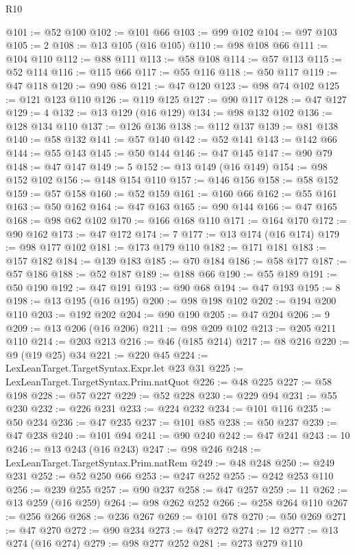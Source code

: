 \begin{lexlean}{R10}
\begin{coremodule}
@101 := @52 @100
@102 := @101 @66
@103 := @99 @102
@104 := @97 @103
@105 := 2
@108 := @13 @105 (@16 @105)
@110 := @98 @108 @66
@111 := @104 @110
@112 := @88 @111
@113 := @58 @108
@114 := @57 @113
@115 := @52 @114
@116 := @115 @66
@117 := @55 @116
@118 := @50 @117
@119 := @47 @118
@120 := @90 @86
@121 := @47 @120
@123 := @98 @74 @102
@125 := @121 @123 @110
@126 := @119 @125
@127 := @90 @117
@128 := @47 @127
@129 := 4
@132 := @13 @129 (@16 @129)
@134 := @98 @132 @102
@136 := @128 @134 @110
@137 := @126 @136
@138 := @112 @137
@139 := @81 @138
@140 := @58 @132
@141 := @57 @140
@142 := @52 @141
@143 := @142 @66
@144 := @55 @143
@145 := @50 @144
@146 := @47 @145
@147 := @90 @79
@148 := @47 @147
@149 := 5
@152 := @13 @149 (@16 @149)
@154 := @98 @152 @102
@156 := @148 @154 @110
@157 := @146 @156
@158 := @58 @152
@159 := @57 @158
@160 := @52 @159
@161 := @160 @66
@162 := @55 @161
@163 := @50 @162
@164 := @47 @163
@165 := @90 @144
@166 := @47 @165
@168 := @98 @62 @102
@170 := @166 @168 @110
@171 := @164 @170
@172 := @90 @162
@173 := @47 @172
@174 := 7
@177 := @13 @174 (@16 @174)
@179 := @98 @177 @102
@181 := @173 @179 @110
@182 := @171 @181
@183 := @157 @182
@184 := @139 @183
@185 := @70 @184
@186 := @58 @177
@187 := @57 @186
@188 := @52 @187
@189 := @188 @66
@190 := @55 @189
@191 := @50 @190
@192 := @47 @191
@193 := @90 @68
@194 := @47 @193
@195 := 8
@198 := @13 @195 (@16 @195)
@200 := @98 @198 @102
@202 := @194 @200 @110
@203 := @192 @202
@204 := @90 @190
@205 := @47 @204
@206 := 9
@209 := @13 @206 (@16 @206)
@211 := @98 @209 @102
@213 := @205 @211 @110
@214 := @203 @213
@216 := @46 (@185 @214)
@217 := @8 @216
@220 := @9 (@19 @25) @34
@221 := @220 @45
@224 := LexLeanTarget.TargetSyntax.Expr.let @23 @31
@225 := LexLeanTarget.TargetSyntax.Prim.natQuot
@226 := @48 @225
@227 := @58 @198
@228 := @57 @227
@229 := @52 @228
@230 := @229 @94
@231 := @55 @230
@232 := @226 @231
@233 := @224 @232
@234 := @101 @116
@235 := @50 @234
@236 := @47 @235
@237 := @101 @85
@238 := @50 @237
@239 := @47 @238
@240 := @101 @94
@241 := @90 @240
@242 := @47 @241
@243 := 10
@246 := @13 @243 (@16 @243)
@247 := @98 @246
@248 := LexLeanTarget.TargetSyntax.Prim.natRem
@249 := @48 @248
@250 := @249 @231
@252 := @52 @250 @66
@253 := @247 @252
@255 := @242 @253 @110
@256 := @239 @255
@257 := @90 @237
@258 := @47 @257
@259 := 11
@262 := @13 @259 (@16 @259)
@264 := @98 @262 @252
@266 := @258 @264 @110
@267 := @256 @266
@268 := @236 @267
@269 := @101 @78
@270 := @50 @269
@271 := @47 @270
@272 := @90 @234
@273 := @47 @272
@274 := 12
@277 := @13 @274 (@16 @274)
@279 := @98 @277 @252
@281 := @273 @279 @110

\end{coremodule}
\end{lexlean}
